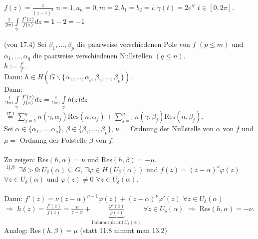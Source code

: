 \documentclass[a4paper,twoside,DIV15,BCOR12mm]{scrbook}
\def\wegint{\ensuremath{\int\limits_\gamma}}
\def\ie{\rm i}
\begin{document}
\begin{beispiel}
  $f(z) = \frac{z}{(z-i)^2}$ $n = 1, a_n=0, m = 2, b_1 = b_2 = i; \gamma(t) = 2
  e^{it}$ $t \in [0,2 \pi]$. $\frac{1}{2 \pi \ie} \wegint \frac{f'(z)}{f(z)} dz = 1
  -2 = -1 $
\end{beispiel}
\begin{beweis} (von 17.4)
  Sei $\beta_1, \ldots, \beta_p$ die paarweise verschiedenen Pole von $f$ $( p
  \leq m)$ und $\alpha_1, \ldots , \alpha_q$ die paarweise verschiedenen
  Nullstellen $(q \leq n)$. \\
  $h := \frac{f'}{f}$. \\ Dann: $h \in H( G \backslash \{\alpha_1, \ldots ,
  \alpha_q,\beta_1, \ldots, \beta_p\})$. \\ Dann: \\
  $\frac{1}{2 \pi \ie} \wegint \frac{f'(z)}{f(z)} dz = \frac{1}{2 \pi \ie}
  \wegint h(z) dz$ $\stackrel{\text{17.1}}{=} \sum\limits_{j=1}^{q} n(\gamma,
  \alpha_j) \text{Res}(n, \alpha_j) + \sum\limits_{j=1}^{p} n(\gamma,
  \beta_j) \text{Res}(n,\beta_j)$. \\
  Sei $\alpha \in \{\alpha_1, \ldots , \alpha_q\}$, $\beta \in \{\beta_1, \ldots,
  \beta_p\}$, $\nu = $ Ordnung der Nullstelle von $\alpha$ von $f$ und $\mu = $
  Ordnung der Polstelle $\beta$ von $f$. \\ \\
  Zu zeigen: Res$(h, \alpha) = \nu$ und Res$(h, \beta) = -\mu$. \\
  $\stackrel{11.8}{=}$ $\exists \delta > 0: U_{\delta}(\alpha) \subseteq G$,
  $\exists \varphi \in H(U_{\delta}(\alpha))$ und $f(z) =
  (z-\alpha)^{\nu}\varphi(z)$ $\forall z \in U_{\delta}(\alpha)$ und $\varphi(z)
  \neq 0$ $\forall z \in U_{\delta}(\alpha)$. \\ \\
  Dann: $f'(z)=\nu (z-\alpha)^{\nu -1}\varphi(z) + (z-\alpha)^{\nu}\varphi'(z)$
  $\forall z \in U_{\delta}(\alpha)$\\ $\Rightarrow$ $h(z) = \frac{f'(z)}{f(z)} =
  \frac{\nu}{z - \alpha}+ \underbrace{\frac{\varphi'(z)}{\varphi(z)}}_{\text{holomorph
  auf} \ U_{\delta}(\alpha)} $ $\forall z \in U_{\delta}(\alpha)$ $\Rightarrow$
  Res$(h, \alpha) = -\nu$. \\
  Analog: Res$(h, \beta) = \mu$ (statt 11.8 nimmt man 13.2)
\end{beweis}
\end{document}
